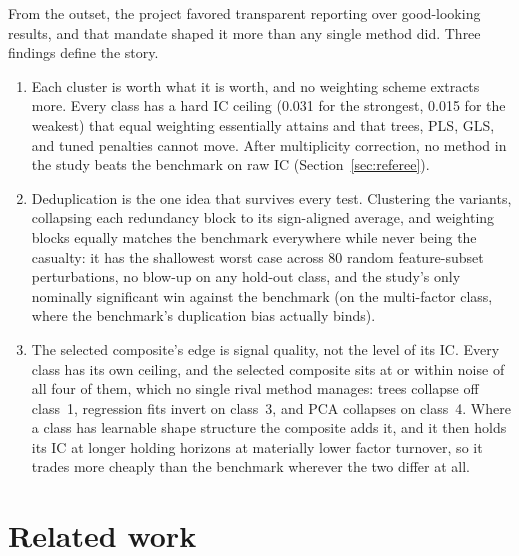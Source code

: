 \documentclass[11pt]{article}
\begin{document}
From the outset, the project favored transparent reporting over good-looking results, and
that mandate shaped it more than any single method did. Three findings define the story.

\begin{enumerate}
\item Each cluster is worth what it is worth, and no weighting scheme extracts more.
      Every class has a hard IC ceiling (0.031 for the strongest, 0.015 for the weakest) that
      equal weighting essentially attains and that trees, PLS, GLS, and tuned penalties cannot
      move. After multiplicity correction, no method in the study beats the benchmark on
      raw IC (Section~\ref{sec:referee}).
\item Deduplication is the one idea that survives every test. Clustering the
      variants, collapsing each redundancy block to its sign-aligned average, and
      weighting blocks equally matches the benchmark everywhere while never being the
      casualty: it has the shallowest worst case across 80 random feature-subset
      perturbations, no blow-up on any hold-out class, and the study's only nominally
      significant win against the benchmark (on the multi-factor class, where the
      benchmark's duplication bias actually binds).
\item The selected composite's edge is signal quality, not the level of its IC.
      Every class has its own ceiling, and the selected composite sits at or within noise
      of all four of them, which no single rival method manages: trees collapse off
      class~1, regression fits invert on class~3, and PCA collapses on class~4. Where a
      class has learnable shape structure the composite adds it, and it then holds its IC
      at longer holding horizons at materially lower factor turnover, so it trades more
      cheaply than the benchmark wherever the two differ at all.
\end{enumerate}

\FloatBarrier
\section{Related work}
\label{sec:related}
\end{document}
